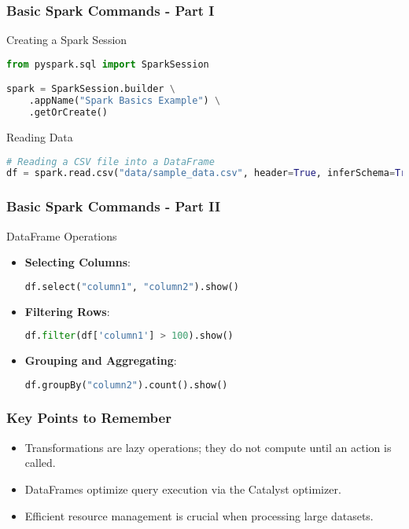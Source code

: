 \documentclass[aspectratio=169]{beamer}
\begin{document}
\begin{frame}[fragile]
    \frametitle{Basic Spark Commands - Part I}
    \begin{block}{Creating a Spark Session}
    \begin{lstlisting}[language=Python]
from pyspark.sql import SparkSession

spark = SparkSession.builder \
    .appName("Spark Basics Example") \
    .getOrCreate()
    \end{lstlisting}
    \end{block}

    \begin{block}{Reading Data}
    \begin{lstlisting}[language=Python]
# Reading a CSV file into a DataFrame
df = spark.read.csv("data/sample_data.csv", header=True, inferSchema=True)
    \end{lstlisting}
    \end{block}
\end{frame}

\begin{frame}[fragile]
    \frametitle{Basic Spark Commands - Part II}
    \begin{block}{DataFrame Operations}
        \begin{itemize}
            \item \textbf{Selecting Columns}:
            \begin{lstlisting}[language=Python]
df.select("column1", "column2").show()
            \end{lstlisting}
            
            \item \textbf{Filtering Rows}:
            \begin{lstlisting}[language=Python]
df.filter(df['column1'] > 100).show()
            \end{lstlisting}
            
            \item \textbf{Grouping and Aggregating}:
            \begin{lstlisting}[language=Python]
df.groupBy("column2").count().show()
            \end{lstlisting}
        \end{itemize}
    \end{block}
\end{frame}

\begin{frame}
    \frametitle{Key Points to Remember}
    \begin{itemize}
        \item Transformations are lazy operations; they do not compute until an action is called.
        \item DataFrames optimize query execution via the Catalyst optimizer.
        \item Efficient resource management is crucial when processing large datasets.
    \end{itemize}
\end{frame}
\end{document}
